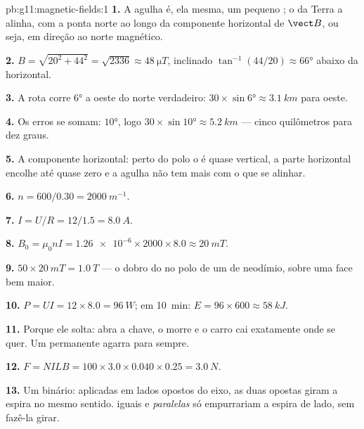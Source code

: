 \begin{solution}{pb:g11:magnetic-fields:1}
\textbf{1.} A agulha é, ela mesma, um pequeno ; o  da Terra a
alinha, com a ponta norte ao longo da componente horizontal de $\vect B$,
ou seja, em direção ao norte magnético.

\textbf{2.} $B = \sqrt{20^2 + 44^2} = \sqrt{2336} \approx
\qty{48}{\micro T}$, inclinado $\tan^{-1}(44/20) \approx \ang{66}$
abaixo da horizontal.

\textbf{3.} A rota corre $\ang{6}$ a oeste do norte verdadeiro:
$30 \times \sin\ang{6} \approx \qty{3.1}{km}$ para oeste.

\textbf{4.} Os erros se somam: $\ang{10}$, logo
$30 \times \sin\ang{10} \approx \qty{5.2}{km}$ --- cinco quilômetros
para dez graus.

\textbf{5.} A componente horizontal: perto do polo o  é quase
vertical, a parte horizontal encolhe até quase zero e a agulha não tem
mais com o que se alinhar.

\textbf{6.} $n = 600/0.30 = \qty{2000}{m^{-1}}$.

\textbf{7.} $I = U/R = 12/1.5 = \qty{8.0}{A}$.

\textbf{8.} $B_0 = \mu_0 n I = \num{1.26e-6} \times 2000 \times 8.0
\approx \qty{20}{mT}$.

\textbf{9.} $50 \times \qty{20}{mT} = \qty{1.0}{T}$ --- o dobro do 
no polo de um  de neodímio, sobre uma face bem maior.

\textbf{10.} $P = UI = 12 \times 8.0 = \qty{96}{W}$; em
\qty{10}{\minute}: $E = 96 \times 600 \approx \qty{58}{kJ}$.

\textbf{11.} Porque ele solta: abra a chave, o  morre e o carro cai
exatamente onde se quer. Um  permanente agarra para sempre.

\textbf{12.} $F = NILB = 100 \times 3.0 \times 0.040 \times 0.25 =
\qty{3.0}{N}$.

\textbf{13.} Um binário: aplicadas em lados opostos do eixo, as duas
 opostas giram a espira no mesmo sentido.  iguais e
\emph{paralelas} só empurrariam a espira de lado, sem fazê-la girar.


\end{solution}
